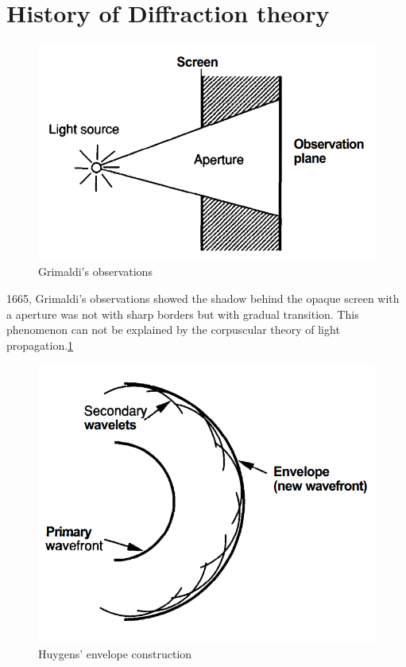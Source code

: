 \documentclass[../main.tex]{subfiles}
\begin{document}
	\section{History of Diffraction theory}
	\begin{figure}[h!]
	  \centering
	  \includegraphics[scale=0.5]{../graphics/Wave_optics1.png}
	  \caption{Grimaldi's observations}
	  \label{fig:Grimaldi}
	\end{figure}
	1665, Grimaldi's observations showed the shadow behind the opaque screen with a aperture was not with sharp borders but with gradual transition. This phenomenon can not be explained by the corpuscular theory of light propagation.\ref{fig:Grimaldi}

	\begin{figure}[h!]
	  \centering
	  \includegraphics[scale=0.5]{../graphics/Wave_optics2.png}
	  \caption{Huygens' envelope construction}
	  \label{fig:Huygens}
	\end{figure}
\end{document}

